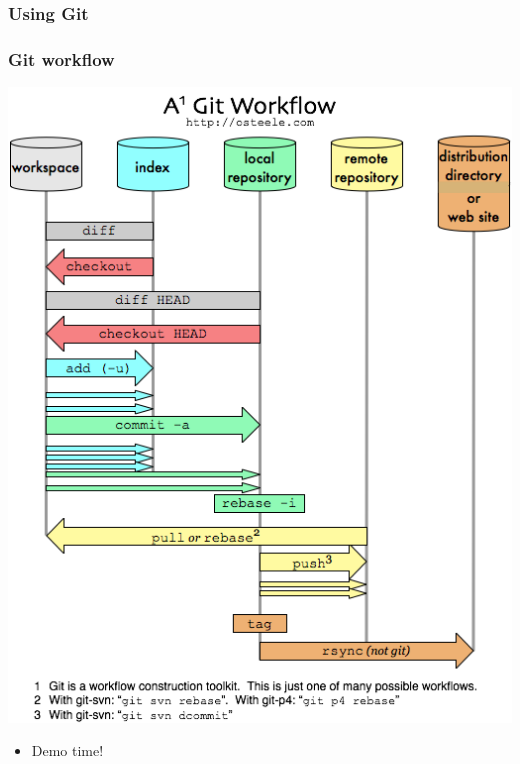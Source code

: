 \documentclass{beamer}
\begin{document}

\subsubsection{Using Git}

\begin{frame}
    \frametitle{Git workflow}
    \includegraphics[scale = 0.3]{images/git-workflow.png}
\end{frame}

\begin{frame}
    \begin{itemize}
	\item Demo time!
    \end{itemize}
\end{frame}
\end{document}
